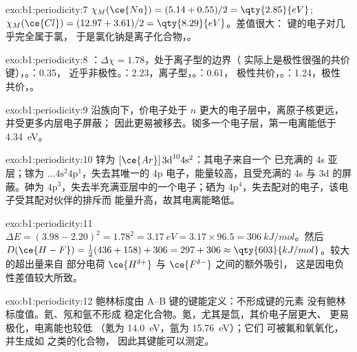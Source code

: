 \begin{solution}{exo:b1:periodicity:7}
$\chi_M(\ce{Na}) = (5.14 + 0.55)/2 = \qty{2.85}{eV}$; $\chi_M(\ce{Cl}) =
(12.97 + 3.61)/2 = \qty{8.29}{eV}$。差值很大：
 键的电子对几乎完全属于氯，
于是氯化钠是离子化合物，。
\end{solution}

\begin{solution}{exo:b1:periodicity:8}
：$\Delta\chi = 1.78$，处于离子型的边界（
实际上是极性很强的共价键），。：0.35，
近乎非极性。：2.23，离子型，。：0.61，
极性共价，。：1.24，极性
共价，。
\end{solution}

\begin{solution}{exo:b1:periodicity:9}
沿族向下，价电子处于 $n$ 更大的电子层中，离原子核更远，
并受更多内层电子屏蔽；
因此更易被移去。铷多一个电子层，第一电离能低于
\qty{4.34}{eV}。
\end{solution}

\begin{solution}{exo:b1:periodicity:10}
锌为 $[\ce{Ar}]\,3\text{d}^{10} 4\text{s}^2$：其电子来自一个
已充满的 4s 亚层；镓为 $\dots 4\text{s}^2 4\text{p}^1$，失去其唯一的
4p 电子，能量较高，且受充满的 4s 与 3d 的屏蔽。砷为
$4\text{p}^3$，失去半充满亚层中的一个电子；硒为
$4\text{p}^4$，失去配对的电子，该电子受其配对伙伴的排斥而
能量升高，故其电离能略低。
\end{solution}

\begin{solution}{exo:b1:periodicity:11}
$\Delta E = (3.98 - 2.20)^2 = 1.78^2 = \qty{3.17}{eV} = 3.17 \times 96.5 =
\qty{306}{kJ/mol}$。然后 $D(\ce{H-F}) = \tfrac12(436 + 158) + 306 = 297 +
306 \approx \qty{603}{kJ/mol}$。较大的超出量来自
部分电荷 $\ce{H^{\delta+}}$ 与 $\ce{F^{\delta-}}$ 之间的额外吸引，
这是因电负性差值较大所致。
\end{solution}

\begin{solution}{exo:b1:periodicity:12}
鲍林标度由 A--B 键的键能定义：不形成键的元素
没有鲍林标度值。氦、氖和氩不形成
稳定化合物。氪，尤其是氙，其价电子层更大、
更易极化，电离能也较低
（氪为 \qty{14.0}{eV}，氩为 \qty{15.76}{eV}）；它们
可被氟和氧氧化，并生成如  之类的化合物，
因此其键能可以测定。
\end{solution}

